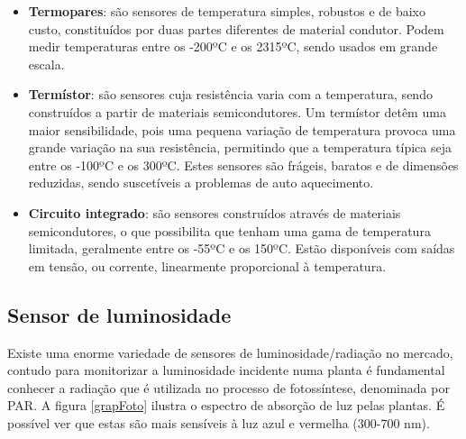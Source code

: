 \begin{itemize}
	\item \textbf{Termopares}: são sensores de temperatura simples, robustos e de baixo custo, constituídos por duas partes diferentes de material condutor. Podem medir temperaturas entre os -200ºC e os 2315ºC, sendo usados em grande escala\cite{REOTEMPInstrumentCorporation}. 
	 
	
	\item \textbf{Termístor}: são sensores cuja resistência varia com a temperatura, sendo construídos a partir de materiais semicondutores. Um termístor detêm uma maior sensibilidade, pois uma pequena variação de temperatura provoca uma grande variação na sua resistência, permitindo que a temperatura típica seja entre os -100ºC e os 300ºC. Estes sensores são frágeis, baratos e de dimensões reduzidas, sendo suscetíveis a problemas de auto aquecimento\cite{TemperatureSensors}.
	

	\item \textbf{Circuito integrado}: são sensores construídos através de materiais semicondutores, o que possibilita que tenham uma gama de temperatura limitada, geralmente entre os -55ºC e os 150ºC. 	Estão disponíveis com saídas em tensão, ou corrente, linearmente proporcional à temperatura. 


\end{itemize}





\subsection{Sensor de luminosidade }




Existe uma enorme variedade de sensores de luminosidade/radiação no mercado, contudo para monitorizar a luminosidade incidente numa planta é fundamental conhecer a radiação que é utilizada no processo de fotossíntese, denominada por \ac{PAR}. A figura \ref{grapFoto} ilustra o espectro de absorção de luz pelas plantas. É possível ver que estas são mais sensíveis à luz azul e vermelha (300-700 nm).





